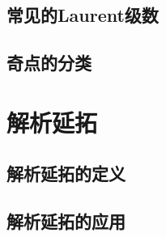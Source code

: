     \subsection{常见的Laurent级数}

    \subsection{奇点的分类}


\section{解析延拓}

    \subsection{解析延拓的定义}

    \subsection{解析延拓的应用}